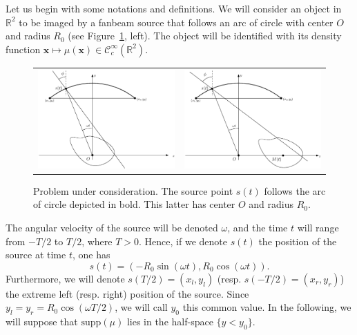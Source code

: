 \documentclass[a4paper]{article}
\numberwithin{equation}{section}
\newcommand{\R}{\mathbb{R}}
\newcommand{\Ccinf}{\mathcal{C}_c^{\infty}}
\newcommand{\supp}{\textrm{supp}}
\begin{document}
Let us begin with some notations and definitions. We will consider an object in $\R^2$ to be imaged by a fanbeam source that follows an arc of circle with center $O$ and radius $R_0$ (see Figure~\ref{fig:notations}, left). The object will be identified with its density function $\mathbf{x} \mapsto \mu(\mathbf{x}) \in \Ccinf(\R^2)$.
\begin{figure}[!ht]
	\centering
	\begin{tabular}{cc}
	\includegraphics[width=8cm]{figs/frame_scanner_still.eps} &
	\includegraphics[width=8cm]{figs/frame_scanner.eps}
	\end{tabular}
	\caption{Problem under consideration. The source point $s(t)$ follows the arc of circle depicted in bold. This latter has center $O$ and radius $R_0$.\label{fig:notations}}
\end{figure}
The angular velocity of the source will be denoted $\omega$, and the time $t$ will range from $-T/2$ to $T/2$, where $T>0$. Hence, if we denote $s(t)$ the position of the source at time $t$, one has
\begin{equation}
	s(t) = \left( -R_0 \sin(\omega t), R_0 \cos(\omega t) \right).
\label{eq:source_position}
\end{equation}
Furthermore, we will denote $s(T/2)=(x_l,y_l)$ (resp. $s(-T/2)=(x_r,y_r)$) the extreme left (resp. right) position of the source. Since $y_l = y_r = R_0 \cos(\omega T/2)$, we will call $y_0$ this common value. In the following, we will suppose that $\supp(\mu)$ lies in the half-space $\{ y < y_0 \}$.
\end{document}
